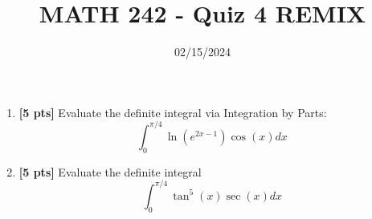 \documentclass[12pt]{article}
\title{MATH 242 - Quiz 4 REMIX}
\date{02/15/2024}
\begin{document}
\maketitle


\begin{enumerate}

\item \textbf{[5 pts]} Evaluate the definite integral via Integration by Parts:
$$\int_0^{\pi/4} \ln(e^{2x-1})\cos(x)dx$$


\pagebreak


\item \textbf{[5 pts]} Evaluate the definite integral
$$\int_0^{\pi/4}\tan^5(x)\sec(x)dx$$


\end{enumerate}
\end{document}
